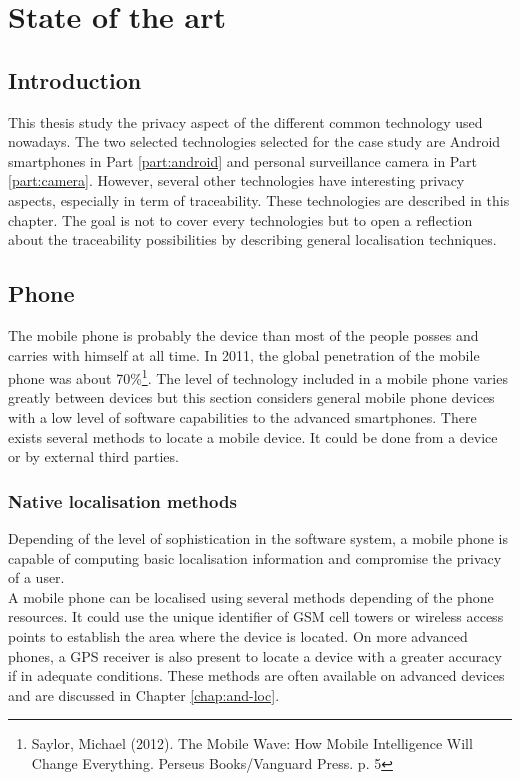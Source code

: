 \chapter{State of the art}
\label{chap:general}

\section*{Introduction}
\label{sec:soa-intro}

This thesis study the privacy aspect of the different common technology used nowadays.
The two selected technologies selected for the case study are Android smartphones in Part \ref{part:android} and personal surveillance camera in Part \ref{part:camera}.
However, several other technologies have interesting privacy aspects, especially in term of traceability.
These technologies are described in this chapter.
The goal is not to cover every technologies but to open a reflection about the traceability possibilities by describing general localisation techniques.

\section{Phone}

The mobile phone is probably the device than most of the people posses and carries with himself at all time.
In 2011, the global penetration of the mobile phone was about 70\%\footnote{Saylor, Michael (2012). The Mobile Wave: How Mobile Intelligence Will Change Everything. Perseus Books/Vanguard Press. p. 5}.
The level of technology included in a mobile phone varies greatly between devices but this section considers general mobile phone devices with a low level of software capabilities to the advanced smartphones.
There exists several methods to locate a mobile device.
It could be done from a device or by external third parties.

\subsection{Native localisation methods}

Depending of the level of sophistication in the software system, a mobile phone is capable of computing basic localisation information and compromise the privacy of a user.\\

A mobile phone can be localised using several methods depending of the phone resources.
It could use the unique identifier of GSM cell towers or wireless access points to establish the area where the device is located.
On more advanced phones, a GPS receiver is also present to locate a device with a greater accuracy if in adequate conditions.
These methods are often available on advanced devices and are discussed in Chapter \ref{chap:and-loc}.

